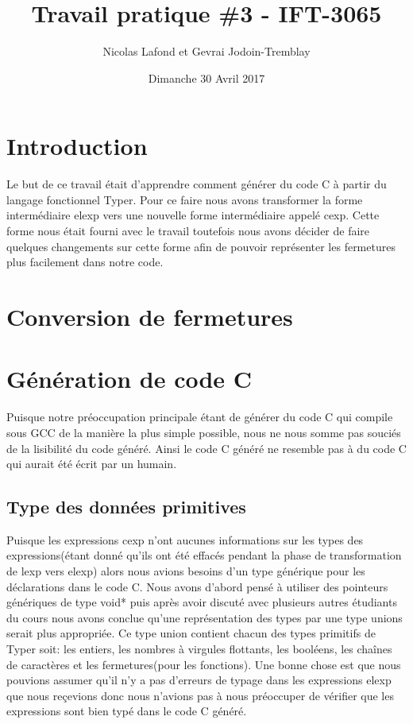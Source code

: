 \documentclass{article}
\begin{document}
\title{Travail pratique \#3 - IFT-3065}
\author{Nicolas Lafond et Gevrai Jodoin-Tremblay}
\date{Dimanche 30 Avril 2017}
\maketitle

\section{Introduction}
Le but de ce travail était d'apprendre comment générer du code C à partir du 
langage fonctionnel Typer. Pour ce faire nous avons transformer la forme
intermédiaire elexp vers une nouvelle forme intermédiaire appelé cexp. Cette
forme nous était fourni avec le travail toutefois nous avons décider de faire
quelques changements sur cette forme afin de pouvoir représenter les fermetures
plus facilement dans notre code.

\section{Conversion de fermetures}

\section{Génération de code C}
Puisque notre préoccupation principale étant de générer du code C qui compile
sous GCC de la manière la plus simple possible, nous ne nous somme pas souciés
de la lisibilité du code généré. Ainsi le code C généré ne resemble pas à du
code C qui aurait été écrit par un humain.

\subsection{Type des données primitives}
Puisque les expressions cexp n'ont aucunes informations sur les types des 
expressions(étant donné qu'ils ont été effacés pendant la phase de 
transformation de lexp vers elexp) alors nous avions besoins d'un type
générique pour les déclarations dans le code C. Nous avons d'abord pensé à
utiliser des pointeurs génériques de type void* puis après avoir discuté avec
plusieurs autres étudiants du cours nous avons conclue qu'une représentation
des types par une type unions serait plus appropriée. Ce type union contient
chacun des types primitifs de Typer soit: les entiers, les nombres à virgules
flottants, les booléens, les chaînes de caractères et les fermetures(pour les
fonctions). Une bonne chose est que nous pouvions assumer qu'il n'y a pas
d'erreurs de typage dans les expressions elexp que nous reçevions donc nous
n'avions pas à nous préoccuper de vérifier que les expressions sont bien
typé dans le code C généré.
\end{document}
